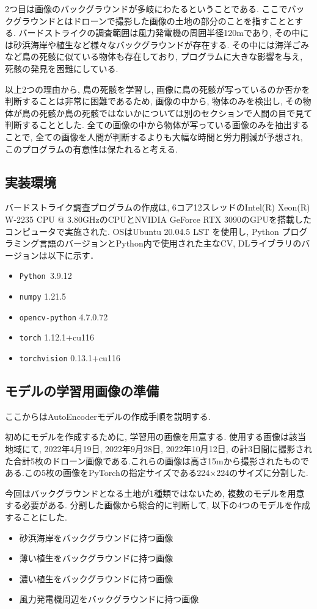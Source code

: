 \documentclass[dvipdfmx]{jsarticle}
\begin{document}
2つ目は画像のバックグラウンドが多岐にわたるということである.
ここでバックグラウンドとはドローンで撮影した画像の土地の部分のことを指すこととする.
バードストライクの調査範囲は風力発電機の周囲半径120mであり, 
その中には砂浜海岸や植生など様々なバックグラウンドが存在する.
その中には海洋ごみなど鳥の死骸に似ている物体も存在しており, プログラムに大きな影響を与え, 死骸の発見を困難にしている.

以上2つの理由から, 鳥の死骸を学習し, 画像に鳥の死骸が写っているのか否かを判断することは非常に困難であるため, 
画像の中から, 物体のみを検出し, その物体が鳥の死骸か鳥の死骸ではないかについては別のセクションで人間の目で見て判断することとした.
全ての画像の中から物体が写っている画像のみを抽出することで, 全ての画像を人間が判断するよりも大幅な時間と労力削減が予想され, 
このプログラムの有意性は保たれると考える.
\subsection{実装環境}
バードストライク調査プログラムの作成は, 6コア12スレッドのIntel(R) Xeon(R) W-2235 CPU @ 3.80GHzのCPUとNVIDIA GeForce RTX 3090のGPUを搭載したコンピュータで実施された.
OSはUbuntu 20.04.5 LST を使用し, Python プログラミング言語のバージョンとPython内で使用された主なCV, DLライブラリのバージョンは以下に示す．

\begin{itemize}
    \item \verb|Python |3.9.12
    \item \verb|numpy| 1.21.5
    \item \verb|opencv-python| 4.7.0.72
    \item \verb|torch| 1.12.1+cu116
    \item \verb|torchvision| 0.13.1+cu116
    
\end{itemize}
\subsection{モデルの学習用画像の準備}
ここからはAutoEncoderモデルの作成手順を説明する.

初めにモデルを作成するために, 学習用の画像を用意する.
使用する画像は該当地域にて, 
2022年4月19日, 2022年9月28日, 2022年10月12日, の計3日間に撮影された合計5枚のドローン画像である.これらの画像は高さ15mから撮影されたものである.この5枚の画像をPyTorchの指定サイズである224×224のサイズに分割した.

今回はバックグラウンドとなる土地が1種類ではないため, 複数のモデルを用意する必要がある.
分割した画像から総合的に判断して, 以下の4つのモデルを作成することにした.
\begin{itemize}
    \item 砂浜海岸をバックグラウンドに持つ画像
    \item 薄い植生をバックグラウンドに持つ画像
    \item 濃い植生をバックグラウンドに持つ画像
    \item 風力発電機周辺をバックグラウンドに持つ画像
\end{itemize}
\end{document}

